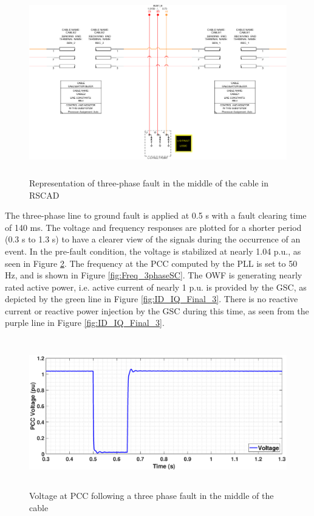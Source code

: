 \begin{figure}[H]
\centering
    \includegraphics[height = 8cm,width = 14cm]{Diagrams/Chapter_3/2CablesBlockWithFault.pdf}
    \caption{Representation of three-phase fault in the middle of the cable in RSCAD}
    \label{fig:2cablesblockwithfault}
\end{figure}

The three-phase line to ground fault is applied at 0.5 s with a fault clearing time of 140 ms. The voltage and frequency responses are plotted for a shorter period (0.3 s to 1.3 s) to have a clearer view of the signals during the occurrence of an event. In the pre-fault condition, the voltage is stabilized at nearly 1.04 p.u., as seen in Figure \ref{fig:Vol_3phaseSC}. 
The frequency at the \gls{PCC} computed by the \gls{PLL} is set to 50 Hz, and is shown in Figure \ref{fig:Freq_3phaseSC}.
The \gls{OWF} is generating nearly rated active power, i.e. active current of nearly 1 p.u. is provided by the \gls{GSC}, as depicted by the green line in Figure \ref{fig:ID_IQ_Final_3}. There is no reactive current or reactive power injection by the \gls{GSC} during this time, as seen from the purple line in Figure \ref{fig:ID_IQ_Final_3}. 

\begin{figure}[H]
    \includegraphics[height = 6.5cm,width = \textwidth]{Diagrams/Chapter_3/VACP_RSCAD.eps}
    \caption{Voltage at PCC following a three phase fault in the middle of the cable}
    \label{fig:Vol_3phaseSC}
\end{figure}

